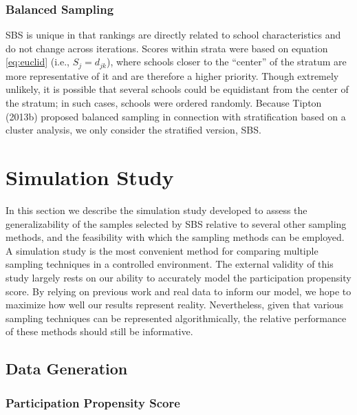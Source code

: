 \documentclass[man,floatsintext]{apa6}
\begin{document}
\hypertarget{balanced-sampling-1}{%
\subsubsection{Balanced Sampling}\label{balanced-sampling-1}}

SBS is unique in that rankings are directly related to school characteristics and do not change across iterations. Scores within strata were based on equation \eqref{eq:euclid} (i.e., \(S_j = d_{jk}\)), where schools closer to the \enquote{center} of the stratum are more representative of it and are therefore a higher priority. Though extremely unlikely, it is possible that several schools could be equidistant from the center of the stratum; in such cases, schools were ordered randomly.
Because Tipton (2013b) proposed balanced sampling in connection with stratification based on a cluster analysis, we only consider the stratified version, SBS.

\hypertarget{simulation-study}{%
\section{Simulation Study}\label{simulation-study}}

In this section we describe the simulation study developed to assess the generalizability of the samples selected by SBS relative to several other sampling methods, and the feasibility with which the sampling methods can be employed. A simulation study is the most convenient method for comparing multiple sampling techniques in a controlled environment. The external validity of this study largely rests on our ability to accurately model the participation propensity score. By relying on previous work and real data to inform our model, we hope to maximize how well our results represent reality. Nevertheless, given that various sampling techniques can be represented algorithmically, the relative performance of these methods should still be informative.

\hypertarget{data-generation}{%
\subsection{Data Generation}\label{data-generation}}

\hypertarget{participation-propensity-score}{%
\subsubsection{Participation Propensity Score}\label{participation-propensity-score}}
\end{document}
